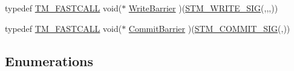 \begin{DoxyCompactItemize}
\item 
typedef \hyperlink{platform_8hpp_a8b5d728e6eed8f368f9966f637d2f719}{T\-M\-\_\-\-F\-A\-S\-T\-C\-A\-L\-L} void($\ast$ \hyperlink{namespacestm_a90bdf03fe1fd826eba4bc9321e318798}{Write\-Barrier} )(\hyperlink{include_2stm_2macros_8hpp_a05836a7c31fa89c1c84557f4691c44d3}{S\-T\-M\-\_\-\-W\-R\-I\-T\-E\-\_\-\-S\-I\-G}(,,,))
\item 
typedef \hyperlink{platform_8hpp_a8b5d728e6eed8f368f9966f637d2f719}{T\-M\-\_\-\-F\-A\-S\-T\-C\-A\-L\-L} void($\ast$ \hyperlink{namespacestm_a16e5b681852106be63d320e490c05165}{Commit\-Barrier} )(\hyperlink{include_2stm_2macros_8hpp_a1b8304eb1082517c7dc31f3534b72343}{S\-T\-M\-\_\-\-C\-O\-M\-M\-I\-T\-\_\-\-S\-I\-G}(,))
\end{DoxyCompactItemize}
\subsection*{Enumerations}
